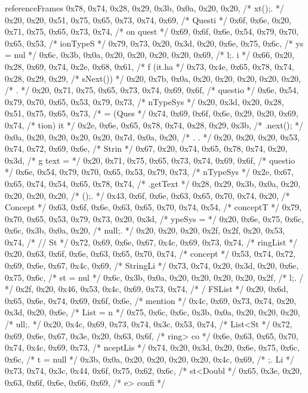 \begin{chunk}{referenceFrames}
{{{{0x78, 0x74, 0x28, 0x29, 0x3b, 0x0a, 0x20, 0x20, /* xt();.   */
0x20, 0x20, 0x51, 0x75, 0x65, 0x73, 0x74, 0x69, /*   Questi */
0x6f, 0x6e, 0x20, 0x71, 0x75, 0x65, 0x73, 0x74, /* on quest */
0x69, 0x6f, 0x6e, 0x54, 0x79, 0x70, 0x65, 0x53, /* ionTypeS */
0x79, 0x73, 0x20, 0x3d, 0x20, 0x6e, 0x75, 0x6c, /* ys = nul */
0x6c, 0x3b, 0x0a, 0x20, 0x20, 0x20, 0x20, 0x69, /* l;.    i */
0x66, 0x20, 0x28, 0x69, 0x74, 0x2e, 0x68, 0x61, /* f (it.ha */
0x73, 0x4e, 0x65, 0x78, 0x74, 0x28, 0x29, 0x29, /* sNext()) */
0x20, 0x7b, 0x0a, 0x20, 0x20, 0x20, 0x20, 0x20, /*  {.      */
0x20, 0x71, 0x75, 0x65, 0x73, 0x74, 0x69, 0x6f, /*  questio */
0x6e, 0x54, 0x79, 0x70, 0x65, 0x53, 0x79, 0x73, /* nTypeSys */
0x20, 0x3d, 0x20, 0x28, 0x51, 0x75, 0x65, 0x73, /*  = (Ques */
0x74, 0x69, 0x6f, 0x6e, 0x29, 0x20, 0x69, 0x74, /* tion) it */
0x2e, 0x6e, 0x65, 0x78, 0x74, 0x28, 0x29, 0x3b, /* .next(); */
0x0a, 0x20, 0x20, 0x20, 0x20, 0x7d, 0x0a, 0x20, /* .    }.  */
0x20, 0x20, 0x20, 0x53, 0x74, 0x72, 0x69, 0x6e, /*    Strin */
0x67, 0x20, 0x74, 0x65, 0x78, 0x74, 0x20, 0x3d, /* g text = */
0x20, 0x71, 0x75, 0x65, 0x73, 0x74, 0x69, 0x6f, /*  questio */
0x6e, 0x54, 0x79, 0x70, 0x65, 0x53, 0x79, 0x73, /* nTypeSys */
0x2e, 0x67, 0x65, 0x74, 0x54, 0x65, 0x78, 0x74, /* .getText */
0x28, 0x29, 0x3b, 0x0a, 0x20, 0x20, 0x20, 0x20, /* ();.     */
0x43, 0x6f, 0x6e, 0x63, 0x65, 0x70, 0x74, 0x20, /* Concept  */
0x63, 0x6f, 0x6e, 0x63, 0x65, 0x70, 0x74, 0x54, /* conceptT */
0x79, 0x70, 0x65, 0x53, 0x79, 0x73, 0x20, 0x3d, /* ypeSys = */
0x20, 0x6e, 0x75, 0x6c, 0x6c, 0x3b, 0x0a, 0x20, /*  null;.  */
0x20, 0x20, 0x20, 0x2f, 0x2f, 0x20, 0x53, 0x74, /*    // St */
0x72, 0x69, 0x6e, 0x67, 0x4c, 0x69, 0x73, 0x74, /* ringList */
0x20, 0x63, 0x6f, 0x6e, 0x63, 0x65, 0x70, 0x74, /*  concept */
0x53, 0x74, 0x72, 0x69, 0x6e, 0x67, 0x4c, 0x69, /* StringLi */
0x73, 0x74, 0x20, 0x3d, 0x20, 0x6e, 0x75, 0x6c, /* st = nul */
0x6c, 0x3b, 0x0a, 0x20, 0x20, 0x20, 0x20, 0x2f, /* l;.    / */
0x2f, 0x20, 0x46, 0x53, 0x4c, 0x69, 0x73, 0x74, /* / FSList */
0x20, 0x6d, 0x65, 0x6e, 0x74, 0x69, 0x6f, 0x6e, /*  mention */
0x4c, 0x69, 0x73, 0x74, 0x20, 0x3d, 0x20, 0x6e, /* List = n */
0x75, 0x6c, 0x6c, 0x3b, 0x0a, 0x20, 0x20, 0x20, /* ull;.    */
0x20, 0x4c, 0x69, 0x73, 0x74, 0x3c, 0x53, 0x74, /*  List<St */
0x72, 0x69, 0x6e, 0x67, 0x3e, 0x20, 0x63, 0x6f, /* ring> co */
0x6e, 0x63, 0x65, 0x70, 0x74, 0x4c, 0x69, 0x73, /* nceptLis */
0x74, 0x20, 0x3d, 0x20, 0x6e, 0x75, 0x6c, 0x6c, /* t = null */
0x3b, 0x0a, 0x20, 0x20, 0x20, 0x20, 0x4c, 0x69, /* ;.    Li */
0x73, 0x74, 0x3c, 0x44, 0x6f, 0x75, 0x62, 0x6c, /* st<Doubl */
0x65, 0x3e, 0x20, 0x63, 0x6f, 0x6e, 0x66, 0x69, /* e> confi */
}}}}
\end{chunk}
